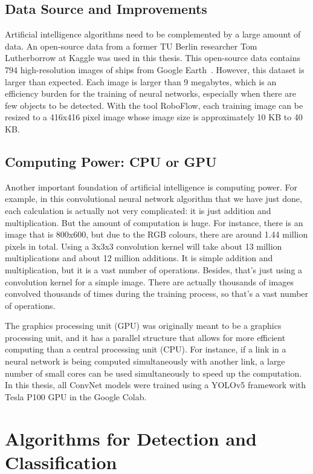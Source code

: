 \newpage
\subsection{Data Source and Improvements}
Artificial intelligence algorithms need to be complemented by a large amount of data. An open-source data from a former TU Berlin researcher Tom Lutherborrow at Kaggle was used in this thesis. This open-source data contains 794 high-resolution images of ships from Google Earth~\cite{lutherborrowship}. However, this dataset is larger than expected. Each image is larger than 9 megabytes, which is an efficiency burden for the training of neural networks, especially when there are few objects to be detected. With the tool RoboFlow, each training image can be resized to a 416x416 pixel image whose image size is approximately 10 KB to 40 KB.


\subsection{Computing Power: CPU or GPU}
Another important foundation of artificial intelligence is computing power. For example, in this convolutional neural network algorithm that we have just done, each calculation is actually not very complicated: it is just addition and multiplication. But the amount of computation is huge. For instance, there is an image that is 800x600, but due to the RGB colours, there are around 1.44 million pixels in total. Using a 3x3x3 convolution kernel will take about 13 million multiplications and about 12 million additions. It is simple addition and multiplication, but it is a vast number of operations. Besides, that's just using a convolution kernel for a simple image. There are actually thousands of images convolved thousands of times during the training process, so that's a vast number of operations.

The graphics processing unit (GPU) was originally meant to be a graphics processing unit, and it has a parallel structure that allows for more efficient computing than a central processing unit (CPU). For instance, if a link in a neural network is being computed simultaneously with another link, a large number of small cores can be used simultaneously to speed up the computation. In this thesis, all ConvNet models were trained using a YOLOv5 framework with Tesla P100 GPU in the Google Colab.




\section{Algorithms for Detection and Classification}
